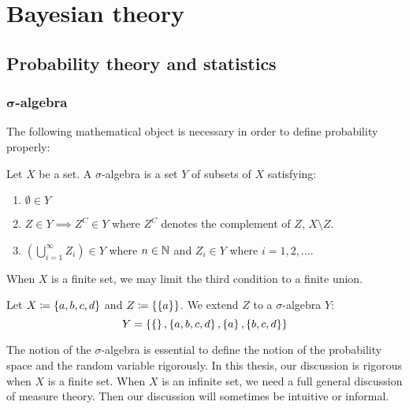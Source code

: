 \chapter{Bayesian theory}
\section{Probability theory and statistics}
\subsection[Sigma-algebra]{$\boldsymbol\sigma$-algebra}
%
The following mathematical object is necessary in order to define probability properly:

\begin{definition}
  Let $X$ be a set. A $\sigma$-algebra is a set $Y$ of subsets of $X$ satisfying:
  \begin{enumerate}
    \item $\emptyset \in Y$
    \item $Z \in Y \implies Z^C \in Y$ where $Z^C$ denotes the complement of $Z$, $X \setminus Z$.
    \item $\left(\bigcup_{i=1}^\infty Z_i\right) \in Y$ where $n \in \mathbb N$ and $Z_i \in Y$ where $i = 1, 2, \ldots$.
  \end{enumerate}
\end{definition}
When $X$ is a finite set, we may limit the third condition to a finite union.

\begin{example}
  Let $X \coloneqq \left\{a, b, c, d\right\}$ and $Z \coloneqq \left\{\left\{a\right\}\right\}$. We extend $Z$ to a $\sigma$-algebra $Y$:
  \[ Y = \left\{\left\{\right\}, \left\{a,b,c,d\right\}, \left\{a\right\}, \left\{b,c,d\right\}\right\} \]
\end{example}
The notion of the $\sigma$-algebra is essential to define the notion of the probability space and the random variable rigorously.
In this thesis, our discussion is rigorous when $X$ is a finite set.
When $X$ is an infinite set, we need a full general discussion of measure theory.
Then our discussion will sometimes be intuitive or informal.

